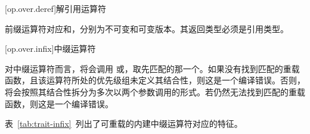 [op.over.deref]{解引用运算符}

\pnum
前缀\tcode{*}运算符对应和，分别为不可变和可变版本。其返回类型必须是引用类型。

[op.over.infix]{中缀运算符}

\pnum
对中缀运算符而言，将会调用
或，取先匹配的那一个。如果没有找到匹配的重载函数，且该运算符所处的优先级组未定义其结合性，则这是一个编译错误。否则，将会按照其结合性拆分为多次以两个参数调用的形式。若仍然无法找到匹配的重载函数，则这是一个编译错误。

\pnum
表~\ref{tab:trait-infix}~列出了可重载的内建中缀运算符对应的特征。

